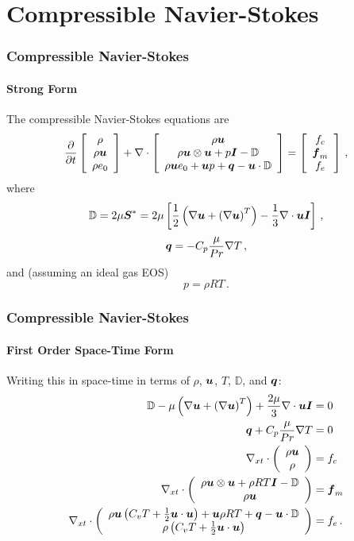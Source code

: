 \documentclass[18pt,xcolor=table]{beamer}
\begin{document}
\section{Compressible Navier-Stokes}

\begin{frame}[t]
\frametitle{Compressible Navier-Stokes}
\framesubtitle{Strong Form}  %
The compressible Navier-Stokes equations are
\begin{align*}
\frac{\partial}{\partial t}\left[ \begin{array}{c} \rho\\ \rho\boldsymbol u\\ \rho e_0\\ \end{array} \right]
+\nabla\cdot\left[ \begin{array}{c} \rho\boldsymbol u\\ \rho\boldsymbol u\otimes\boldsymbol u+p\boldsymbol I-\mathbb{D}\\ \rho\boldsymbol u e_0+\boldsymbol u p+\boldsymbol q-\boldsymbol u\cdot\mathbb{D}\\ \end{array} \right]
=\left[ \begin{array}{c} f_c\\ \boldsymbol f_m\\ f_e\\ \end{array} \right]\,,
\end{align*}
where
\begin{equation*}
  \mathbb{D}=2\mu\boldsymbol S^*=2\mu\left[ \frac{1}{2}\left( \nabla\boldsymbol u+\left( \nabla\boldsymbol u \right)^T \right)-\frac{1}{3}\nabla\cdot\boldsymbol u\boldsymbol I \right]\,,
\end{equation*}
\begin{equation*}
  \boldsymbol q=-C_p\frac{\mu}{Pr}\nabla T\,,
\end{equation*}
and (assuming an ideal gas EOS)
\[
p=\rho R T\,.
\]
\end{frame}

\begin{frame}[t]
\frametitle{Compressible Navier-Stokes}
\framesubtitle{First Order Space-Time Form}  %
Writing this in space-time in terms of $\rho$, $\boldsymbol u$, $T$, $\mathbb{D}$, and $\boldsymbol q$:
\begin{align*}
  \mathbb{D}-\mu\left( \nabla\boldsymbol u+\left( \nabla\boldsymbol u \right)^T \right)+\frac{2\mu}{3}\nabla\cdot\boldsymbol u\boldsymbol I&=0\\
  \boldsymbol q+C_p\frac{\mu}{Pr}\nabla T&=0\\
  \nabla_{xt}\cdot\left( \begin{array}{c} \rho\boldsymbol u\\ \rho\\ \end{array} \right)&=f_c\\
  \nabla_{xt}\cdot\left( \begin{array}{c} \rho\boldsymbol u\otimes\boldsymbol u+\rho RT\boldsymbol I-\mathbb{D}\\ \rho\boldsymbol u\\ \end{array} \right)&=\boldsymbol f_m\\
  \nabla_{xt}\cdot\left( \begin{array}{c} \rho\boldsymbol u\left( C_v T+\frac{1}{2}\boldsymbol u\cdot\boldsymbol u \right)+\boldsymbol u\rho RT+\boldsymbol q-\boldsymbol u\cdot\mathbb{D}\\ \rho\left( C_v T+\frac{1}{2}\boldsymbol u\cdot\boldsymbol u \right)\\ \end{array} \right)&=f_e\,.
\end{align*}
\end{frame}
\end{document}
